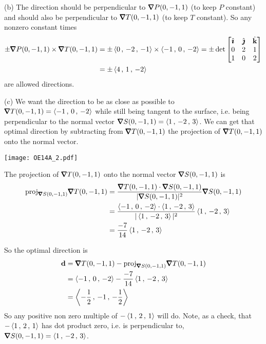 \begin{solution}
(b)
The direction should be perpendicular to $\vnabla P(0,-1,1)$
(to keep $P$ constant) and should also be perpendicular to
$\vnabla T(0,-1,1)$ (to keep $T$ constant). So any nonzero constant times
\begin{align*}
\pm \vnabla P(0,-1,1) \times \vnabla T(0,-1,1)
&=\pm \llt 0 \,,\, -2 \,,\, -1\rgt  \times  \llt -1\,,\,0 \,,\,- 2\rgt
=\pm \det\left[\begin{matrix}
                     \hi & \hj & \hk \\
                     0   &  2  & 1 \\
                     1   &  0  & 2
                \end{matrix}\right] \\
&=\pm \llt  4\,,\,  1 \,,\, -2\rgt
\end{align*}
are allowed directions.

(c) We want the direction to be as close as possible to $\vnabla T(0,-1,1)
=\llt  -1 \,,\, 0 \,,\, -2\rgt$ while still being tangent to the surface, 
i.e. being perpendicular to the normal vector 
$\vnabla S(0,-1,1)=\llt 1 \,,\, -2 \,,\, 3\rgt$.
We can get that optimal direction by subtracting from $\vnabla T(0,-1,1)$
the projection of $\vnabla T(0,-1,1)$ onto the normal vector.

\begin{center}
     \texttt{[image: OE14A\_2.pdf]}
\end{center}

The projection of $\vnabla T(0,-1,1)$ onto the normal vector
$\vnabla S(0,-1,1)$ is
\begin{align*}
\text{proj}_{\vnabla S(0,-1,1)}\vnabla T(0,-1,1)
&=\frac{\vnabla T(0,-1,1)\cdot \vnabla S(0,-1,1)}
         {|\vnabla S(0,-1,1)|^2}\vnabla S(0,-1,1) \\
&=\frac{\llt -1\,,\,0 \,,\,- 2\rgt\cdot \llt 1\,,\, -2 \,,\,3\rgt}
         {|\llt 1\,,\, -2 \,,\,3\rgt|^2}\llt 1\,,\, -2 \,,\,3\rgt \\
&=\frac{-7}{14}\llt 1\,,\, -2 \,,\,3\rgt
\end{align*}

So the optimal direction is
\begin{align*}
\vd&=\vnabla T(0,-1,1) -
\text{proj}_{\vnabla S(0,-1,1)}\vnabla T(0,-1,1) \\
&=\llt -1\,,\,0 \,,\,- 2\rgt
  -\frac{-7}{14}\llt 1\,,\, -2 \,,\,3\rgt \\
&= \llt -\frac{1}{2}\,,\,-1 \,,\,- \frac{1}{2}\rgt
\end{align*}
So any positive non zero multiple of $-\left< 1\,,\, 2\,,\,1\right>$ will do.
Note, as a check, that $-\left< 1\,,\, 2\,,\,1\right>$ has dot product zero,
i.e. is perpendicular to, $\vnabla S(0,-1,1)=\llt 1 \,,\, -2 \,,\, 3\rgt$.
\end{solution}

